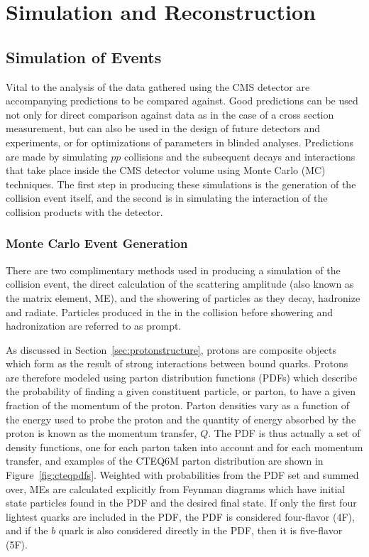 
\chapter{Simulation and Reconstruction}\label{sec:simulation}

\section{Simulation of Events}
 Vital to the analysis of the data
  gathered using the CMS detector
  are accompanying predictions to be compared against.
 Good predictions can be used not only 
  for direct comparison against data
  as in the case of a cross section measurement,
  but can also be used in the design of 
  future detectors and experiments,
  or for optimizations of parameters in blinded analyses.
 Predictions are made by 
  simulating $pp$ collisions and the subsequent
  decays and interactions that take place
  inside the CMS detector volume
  using Monte Carlo (MC) techniques.
 The first step in producing these simulations
  is the generation of the collision event
  itself, and the second
  is in simulating the interaction of the
  collision products with the detector.

\subsection{Monte Carlo Event Generation}
 There are two complimentary methods used
  in producing a simulation of the 
  collision event, the direct calculation 
  of the scattering amplitude
  (also known as the matrix element, ME),
  and the showering of particles as they
  decay, hadronize and radiate.
 Particles produced in the in the 
  collision before showering
  and hadronization are referred to as prompt.

 As discussed in Section~\ref{sec:protonstructure},
  protons are composite objects which form
  as the result of strong 
  interactions between bound quarks.
 Protons are therefore modeled using 
  parton distribution functions (PDFs)
  which describe the probability of
  finding a given constituent particle,
  or parton, to have a given fraction
  of the momentum of the proton.
 Parton densities vary as a function of the
  energy used to probe the proton and the
  quantity of energy absorbed by the 
  proton is known as the momentum transfer, $Q$.
 The PDF is thus actually a set of density functions,
  one for each parton taken into account
  and for each momentum transfer, 
  and examples of the CTEQ6M parton distribution
  are shown in Figure~\ref{fig:cteqpdfs}.
 Weighted with probabilities from the PDF set
  and summed over,
  MEs are calculated explicitly from Feynman
  diagrams which have initial state particles
  found in the PDF and the desired
  final state. 
 If only the first four lightest quarks are
  included in the PDF, the PDF is considered
  four-flavor (4F), and if the $b$ quark
  is also considered directly in the PDF, 
  then it is five-flavor (5F).

